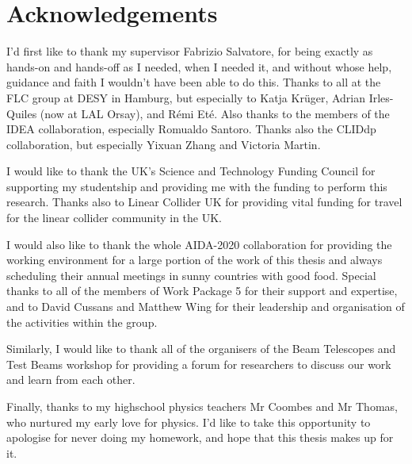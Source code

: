 \chapter*{Acknowledgements}

I'd first like to thank my supervisor Fabrizio Salvatore, for being exactly as hands-on and hands-off as I needed, when I needed it, and without whose help, guidance and faith I wouldn't have been able to do this. Thanks to all at the FLC group at DESY in Hamburg, but especially to Katja Kr\"{u}ger, Adrian Irles-Quiles (now at LAL Orsay), and R\'{e}mi Et\'{e}. Also thanks to the members of the IDEA collaboration, especially Romualdo Santoro. Thanks also the CLIDdp collaboration, but especially Yixuan Zhang and Victoria Martin. \newline

I would like to thank the UK's Science and Technology Funding Council for supporting my studentship and providing me with the funding to perform this research. Thanks also to Linear Collider UK for providing vital funding for travel for the linear collider community in the UK. \newline

I would also like to thank the whole AIDA-2020 collaboration for providing the working environment for a large portion of the work of this thesis and always scheduling their annual meetings in sunny countries with good food. Special thanks to all of the members of Work Package 5 for their support and expertise, and to David Cussans and Matthew Wing for their leadership and organisation of the activities within the group.

Similarly, I would like to thank all of the organisers of the Beam Telescopes and Test Beams workshop for providing a forum for researchers to discuss our work and learn from each other. \newline

Finally, thanks to my highschool physics teachers Mr Coombes and Mr Thomas, who nurtured my early love for physics. I'd like to take this opportunity to apologise for never doing my homework, and hope that this thesis makes up for it.